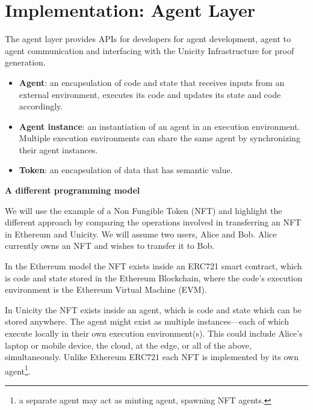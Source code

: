 \documentclass{article}
\begin{document}
\section{Implementation: Agent Layer}


The agent layer provides APIs for developers for agent development, agent to agent communication and interfacing with the Unicity Infrastructure for proof generation. 
\vspace{2mm}

\begin{itemize}
\setlength{\leftmargin}{1em}
\item \textbf{Agent}: an encapsulation of code and state that receives inputs from an external environment, executes its code and updates its state and code accordingly.
\item \textbf{Agent instance}: an instantiation of an agent in an execution environment. Multiple execution environments can share the same agent by synchronizing their agent instances. 
\item \textbf{Token}: an encapsulation of data that has semantic value.
 
\end{itemize}


\textbf{A different programming model}
\vspace{2mm}

We will use the example of a Non Fungible Token (NFT) and highlight the different approach by comparing the operations involved in transferring an NFT in Ethereum and Unicity.  We will assume two users, Alice and Bob. Alice currently owns an NFT and wishes to transfer it to Bob. \vspace{2mm}

In the Ethereum model the NFT exists inside an ERC721 smart contract, which is code and state stored in the Ethereum Blockchain, where the code's execution environment is the Ethereum Virtual Machine (EVM). 

\vspace{2mm}

In Unicity the NFT exists inside an agent, which is code and state which can be stored anywhere.  The agent might exist as multiple instances---each of which execute locally in their own execution environment(s).  This could include Alice's laptop or mobile device, the cloud, at the edge, or all of the above, simultaneously. Unlike Ethereum ERC721 each NFT is implemented by its own agent\footnote{a separate agent may act as minting agent, spawning NFT agents.}.  
\vspace{2mm}
\end{document}
